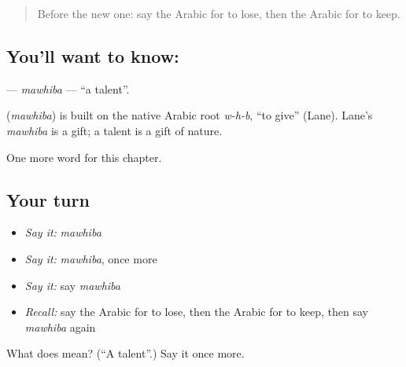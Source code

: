 \label{lesson:AR-C110-mawhiba}



\begin{quote}
Before the new one: say the Arabic for to lose, then the Arabic for to keep.
\end{quote}

\subsection*{You'll want to know: }
\textbf{} — \emph{mawhiba} — \textquotedblleft{}a talent\textquotedblright{}.

\begin{cousinweb}
\textbf{} (\emph{mawhiba}) is built on the native Arabic root \emph{w-h-b}, \textquotedblleft{}to give\textquotedblright{} (Lane). Lane's \emph{mawhiba} is a gift; a talent is a gift of nature.
\end{cousinweb}

\begin{grammarlens}[title={What you've built}]
One more word for this chapter.
\end{grammarlens}

\subsection*{Your turn}
\begin{itemize}
\raggedright
  \item \emph{Say it:} \emph{mawhiba}
  \item \emph{Say it:} \emph{mawhiba}, once more
  \item \emph{Say it:} say \emph{mawhiba}
  \item \emph{Recall:} say the Arabic for to lose, then the Arabic for to keep, then say \emph{mawhiba} again
\end{itemize}

\begin{tcolorbox}[breakable,colback=teal!4,colframe=teal!35!black,title={Before you move on}]
What does  mean? (\textquotedblleft{}A talent\textquotedblright{}.) Say it once more.
\end{tcolorbox}
